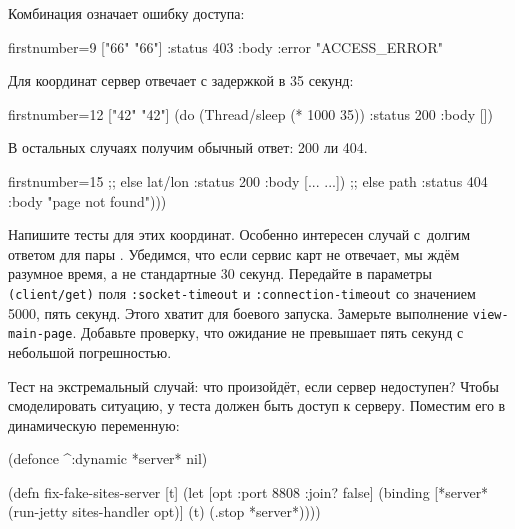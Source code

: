 \noindentnarrow
Комбинация  означает ошибку доступа:

\begin{english}
  \begin{clojure/lines*}{firstnumber=9}
        ["66" "66"]
        {:status 403
         :body {:error "ACCESS_ERROR"}}
  \end{clojure/lines*}
\end{english}

Для координат  сервер отвечает с задержкой в 35 секунд:

\begin{english}
  \begin{clojure/lines*}{firstnumber=12}
        ["42" "42"]
        (do (Thread/sleep (* 1000 35))
            {:status 200 :body []})
  \end{clojure/lines*}
\end{english}

В остальных случаях получим обычный ответ: 200 ли 404.

\begin{english}
  \begin{clojure/lines*}{firstnumber=15}
        ;; else lat/lon
        {:status 200
         :body [{...} {...}]})
      ;; else path
      {:status 404
       :body "page not found"})))
  \end{clojure/lines*}
\end{english}


Напишите тесты для этих координат. Особенно интересен случай с~долгим ответом
для пары . Убедимся, что если сервис карт не отвечает, мы ждём
разумное время, а не стандартные 30 секунд. Передайте в параметры
\verb|(client/get)| поля \verb|:socket-timeout| и \verb|:connection-timeout| со
значением 5000, пять секунд. Этого хватит для боевого запуска. Замерьте
выполнение \verb|view-main-page|. Добавьте проверку, что ожидание не превышает
пять секунд с небольшой погрешностью.

Тест на экстремальный случай: что произойдёт, если сервер недоступен? Чтобы
смоделировать ситуацию, у теста должен быть доступ к серверу. Поместим его в
динамическую переменную:


\ifnarrow

\begin{english}
  \begin{clojure}
(defonce ^:dynamic *server* nil)

(defn fix-fake-sites-server [t]
  (let [opt {:port 8808 :join? false}]
    (binding [*server*
              (run-jetty
                sites-handler opt)]
      (t)
      (.stop *server*))))
  \end{clojure}
\end{english}


